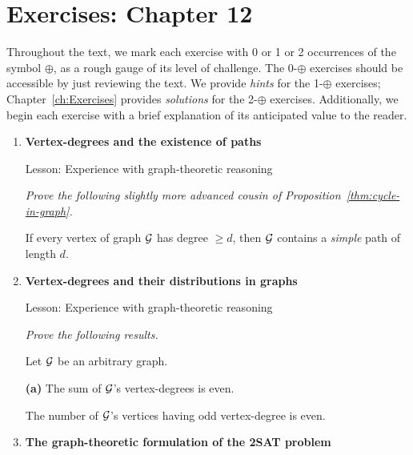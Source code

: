 
\section{Exercises: Chapter 12}

Throughout the text, we mark each exercise with 0 or 1 or 2 occurrences of the symbol $\oplus$, as a rough gauge of its level of challenge.  The 0-$\oplus$ exercises should be accessible by just reviewing the text.  We provide {\em hints} for the 1-$\oplus$ exercises; Chapter~\ref{ch:Exercises} provides {\em solutions} for the 2-$\oplus$ exercises.  Additionally, we begin each exercise with a brief explanation of its anticipated value to the reader.

\begin{enumerate}
\item
{\bf Vertex-degrees and the existence of paths}

{\sc Lesson:} Experience with graph-theoretic reasoning

\smallskip

{\em Prove the following slightly more advanced cousin of Proposition~\ref{thm:cycle-in-graph}.}

 

\begin{prop}
If every vertex of graph $\mbox{$\cal G$}$ has degree $\geq d$, then $\mbox{$\cal G$}$ contains a {\em simple} path of length $d$.
\end{prop}

\smallskip

\medskip\item
{\bf Vertex-degrees and their distributions in graphs}

{\sc Lesson:} Experience with graph-theoretic reasoning

\smallskip

{\em Prove the following results.}

\begin{prop}
Let $\mbox{$\cal G$}$ be an arbitrary graph.
\smallskip

\noindent
{\bf (a)} The sum of $\mbox{$\cal G$}$'s vertex-degrees is even.

\smallskip

The number of $\mbox{$\cal G$}$'s vertices having odd vertex-degree is even.
\end{prop}

\medskip\item
{\bf The graph-theoretic formulation of the {\sf 2SAT} problem}


\end{enumerate}
